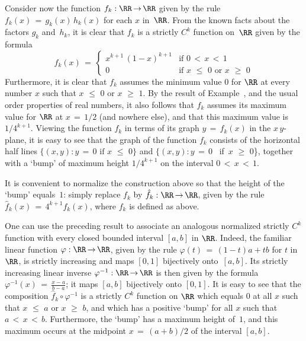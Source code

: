 {        Consider now the function $f_{k}:{\RR} \,{\rightarrow}\, {\RR}$ given by the rule $f_{k}(x) \,=\, g_{k}(x)\,h_{k}(x)$ for each $x$ in~${\RR}$.
    From the known facts about the factors $g_{k}$ and~$h_{k}$, it is clear that $f_{k}$ is a strictly $C^{k}$ function on~${\RR}$ given by the formula
        \begin{displaymath}
        f_{k}(x) \,=\, \left\{
        \begin{array}{ll}
        x^{k+1}\,(1-x)^{k+1} & \mbox{if $0\,<\,x\,<\,1$} \\
          0         & \mbox{if $x\,\,{\leq}\,\,0 \mbox{ or }x\,\,{\geq}\,\,0$}
        \end{array}
                            \right.
        \end{displaymath}
    Furthermore, it is clear that $f_{k}$ assumes the minimum value $0$ for ${\RR}$ at every number $x$ such that $x\,\,{\leq}\,\,0$ or $x\,\,{\geq}\,\,1$.
    By the result of Example~, and the usual order properties of real numbers,
    it also follows that $f_{k}$ assumes its maximum value for ${\RR}$ at $x \,=\, 1/2$ (and nowhere else), and that this maximum value is $1/4^{k+1}$.
    Viewing the function $f_{k}$ in terms of its graph $y \,=\, f_{k}(x)$ in the $x\,y$-plane,
    it is easy to see that the graph of the function $f_{k}$ consists of the horizontal half lines
    $\{(x,y): y \,=\, 0 \mbox{ if $x\,\,{\leq}\,\,0$}\}$ and $\{(x,y): y \,=\, 0$ \mbox{ if $x\,\,{\geq}\,\,0$}\},
    together with a `bump' of maximum height $1/4^{k+1}$ on the interval $0\,<\,x\,<\,1$.

        It is convenient to normalize the construction above so that the height of the `bump' equals~$1$:
    simply replace $f_{k}$ by $\hat{f}_{k}:{\RR} \,{\rightarrow}\, {\RR}$, given by the rule $\hat{f}_{k}(x) \,=\, 4^{k+1}f_{k}(x)$,
    where $f_{k}$ is defined as above.

\V

        One can use the preceding result to associate an analogous normalized strictly $C^{k}$ function with every closed bounded interval $[a,b]$ in ${\RR}$.
    Indeed, the familiar linear function ${\varphi}:{\RR} \,{\rightarrow}\,{\RR}$,
    given by the rule ${\varphi}(t) \,=\, (1-t)a+tb$ for $t$ in ${\RR}$, is strictly increasing and maps $[0,1]$ bijectively onto~$[a,b]$.
    Its strictly increasing linear inverse ${\varphi}^{-1}:{\RR} \,{\rightarrow}\, {\RR}$
    is then given by the formula ${\varphi}^{-1}(x) \,=\, {\displaystyle \frac{x-a}{b-a}}$; it maps $[a,b]$ bijectively onto $[0,1]$.
    It is easy to see that the composition $\hat{f}_{k}{\circ}{\varphi}^{-1}$ is a strictly $C^{k}$ function on ${\RR}$
    which equals $0$ at all $x$ such that $x\,\,{\leq}\,\,a$ or $x\,\,{\geq}\,\,b$,
    and which has a positive `bump' for all $x$ such that $a\,<\,x\,<\,b$. Furthermore, the `bump' has a maximum height of~$1$,
    and this maximum occurs at the midpoint $x \,=\, (a+b)/2$ of the interval $[a,b]$.

}
